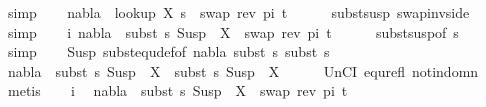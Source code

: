 \begin{isabellebody}
\ simp\isanewline
\ \ \isamarkupfalse%
\ {\isachardoublequoteopen}nabla\ {\isasymturnstile}\ {\isacharparenleft}{\kern0pt}look{\isacharunderscore}{\kern0pt}up\ X\ s{}{\isacharparenright}{\kern0pt}\ {\isasymapprox}\ swap\ {\isacharparenleft}{\kern0pt}rev\ pi{\isacharparenright}{\kern0pt}\ t{}{\isachardoublequoteclose}\isanewline
\ \ \ \ \isamarkupfalse%
\ subst{\isacharunderscore}{\kern0pt}susp\ swap{\isacharunderscore}{\kern0pt}inv{\isacharunderscore}{\kern0pt}side\ \isamarkupfalse%
\ simp\isanewline
\ \ \isamarkupfalse%
\ i{\isacharcolon}{\kern0pt}\ {\isachardoublequoteopen}nabla\ {\isasymturnstile}\ subst\ s{}\ {\isacharparenleft}{\kern0pt}Susp\ {\isacharbrackleft}{\kern0pt}{\isacharbrackright}{\kern0pt}\ X{\isacharparenright}{\kern0pt}\ {\isasymapprox}\ swap\ {\isacharparenleft}{\kern0pt}rev\ pi{\isacharparenright}{\kern0pt}\ t{}{\isachardoublequoteclose}\isanewline
\ \ \ \ \isamarkupfalse%
\ subst{\isacharunderscore}{\kern0pt}susp{\isacharbrackleft}{\kern0pt}of\ s{}\ {\isacartoucheopen}{\isacharbrackleft}{\kern0pt}{\isacharbrackright}{\kern0pt}{\isacartoucheclose}{\isacharbrackright}{\kern0pt}\ \isamarkupfalse%
\ simp\isanewline
\isanewline
\ \ \isamarkupfalse%
\ Susp{\isacharparenleft}{\kern0pt}{}{\isacharparenright}{\kern0pt}\ subst{\isacharunderscore}{\kern0pt}equ{\isacharunderscore}{\kern0pt}def{\isacharbrackleft}{\kern0pt}of\ nabla\ {\isacartoucheopen}subst\ s{}{\isacartoucheclose}\ {\isacartoucheopen}subst\ s{}{\isacartoucheclose}{\isacharbrackright}{\kern0pt}\isanewline
\ \ \isamarkupfalse%
\ {\isachardoublequoteopen}nabla\ {\isasymturnstile}\ subst\ s{}\ {\isacharparenleft}{\kern0pt}Susp\ {\isacharbrackleft}{\kern0pt}{\isacharbrackright}{\kern0pt}\ X{\isacharparenright}{\kern0pt}\ {\isasymapprox}\ subst\ s{}\ {\isacharparenleft}{\kern0pt}Susp\ {\isacharbrackleft}{\kern0pt}{\isacharbrackright}{\kern0pt}\ X{\isacharparenright}{\kern0pt}{\isachardoublequoteclose}\isanewline
\ \ \ \ \isamarkupfalse%
\ UnCI\ equ{\isacharunderscore}{\kern0pt}refl\ not{\isacharunderscore}{\kern0pt}in{\isacharunderscore}{\kern0pt}domn\ \isamarkupfalse%
\ metis\isanewline
\isanewline
\ \ \isamarkupfalse%
\ i\ \isamarkupfalse%
\ {\isachardoublequoteopen}nabla\ {\isasymturnstile}\ subst\ s{}\ {\isacharparenleft}{\kern0pt}Susp\ {\isacharbrackleft}{\kern0pt}{\isacharbrackright}{\kern0pt}\ X{\isacharparenright}{\kern0pt}\ {\isasymapprox}\ swap\ {\isacharparenleft}{\kern0pt}rev\ pi{\isacharparenright}{\kern0pt}\ t{}{\isachardoublequoteclose}\isanewline

\end{isabellebody}

